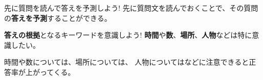 \begin{techniquebox}{先に質問を読んで答えを予測しよう!}
    先に質問文を読んでおくことで、その質問の\textbf{答えを予測}することができる。
\end{techniquebox}

\begin{techniquebox}{\textbf{答えの根拠}となるキーワードを意識しよう!}
    \textbf{時間}や\textbf{数}、\textbf{場所}、\textbf{人物}などは特に意識したい。
\end{techniquebox}
\vspace{1em}

時間や数については、場所については、
人物についてはなどに注意できると正答率が上がってくる。
\newpage
